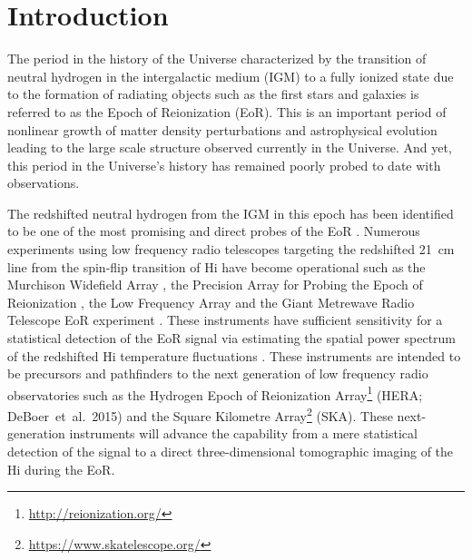 \documentclass[preprint2,iop,numberedappendix,twocolappendix,appendixfloats]{emulateapj}
\begin{document}

\begin{abstract}

\end{abstract}
 

\section{Introduction}\label{intro}

The period in the history of the Universe characterized by the transition of neutral hydrogen in the intergalactic medium (IGM) to a fully ionized state due to the formation of radiating objects such as the first stars and galaxies is referred to as the Epoch of Reionization (EoR). This is an important period of nonlinear growth of matter density perturbations and astrophysical evolution leading to the large scale structure observed currently in the Universe. And yet, this period in the Universe's history has remained poorly probed to date with observations. 

The redshifted neutral hydrogen from the IGM in this epoch has been identified to be one of the most promising and direct probes of the EoR \citep{sun72,sco90,mad97,toz00,ili02}. Numerous experiments using low frequency radio telescopes targeting the redshifted 21~cm line from the spin-flip transition of H{\sc i} have become operational such as the Murchison Widefield Array \citep[MWA;][]{lon09,bow13,tin13}, the Precision Array for Probing the Epoch of Reionization \citep[PAPER;][]{par10}, the Low Frequency Array \citep[LOFAR;][]{van13} and the Giant Metrewave Radio Telescope EoR experiment \citep[GMRT;][]{pac13}. These instruments have sufficient sensitivity for a statistical detection of the EoR signal via estimating the spatial power spectrum of the redshifted H{\sc i} temperature fluctuations \citep{bea13,thy13}. These instruments are intended to be precursors and pathfinders to the next generation of low frequency radio observatories such as the Hydrogen Epoch of Reionization Array\footnote{\url{http://reionization.org/}} (HERA; DeBoer~et~al.~2015) and the Square Kilometre Array\footnote{\url{https://www.skatelescope.org/}} (SKA). These next-generation instruments will advance the capability from a mere statistical detection of the signal to a direct three-dimensional tomographic imaging of the H{\sc i} during the EoR. 
\end{document}
